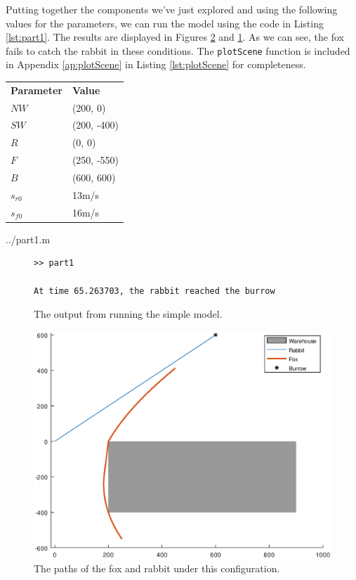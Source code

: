
 Putting together the components we've just explored and using the following values for the parameters, we can run the model using the code in Listing \ref{lst:part1}. The results are displayed in Figures \ref{fig:simplegraph} and \ref{output:simple}. As we can see, the fox fails to catch the rabbit in these conditions. The \texttt{plotScene} function is included in Appendix \ref{ap:plotScene} in Listing \ref{lst:plotScene} for completeness.
 
 \begin{table}[h]
 \centering
\begin{tabular}{ll}
\textbf{Parameter} & \textbf{Value}       \\
$NW$      & (200, 0)    \\
$SW$      & (200, -400) \\
$R$       & (0, 0)      \\
$F$       & (250, -550) \\
$B$       & (600, 600)  \\
$s_{r0}$  & 13m/s       \\
$s_{f0}$  & 16m/s      
\end{tabular}
\end{table}

  {../part1.m}
 
 \begin{figure}[h]
 \caption{The output from running the simple model.}
 \label{output:simple}
 \begin{verbatim}
>> part1

At time 65.263703, the rabbit reached the burrow

 \end{verbatim}
 \end{figure}

\begin{figure}[!hb]
\centering

   \caption{The paths of the fox and rabbit under this configuration.}
   \includegraphics[scale=0.5]{simpleModel.eps}

      \label{fig:simplegraph}
\end{figure}
